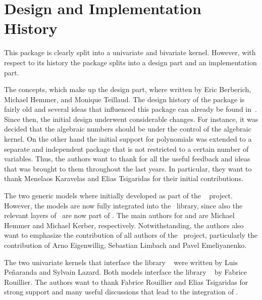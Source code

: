 

\section{Design and Implementation History}

This package is clearly split into a univariate and bivariate
kernel. However, with respect to its history the package splits into
a design part and an implementation part. 

The concepts, which make up the design part, 
where written by Eric Berberich, Michael Hemmer, and
Monique Teillaud. 
The design history of the package is fairly old and several
ideas that influenced this package can already be found
in~\cite{cgal:bhkt-risak-07}. Since then, the initial design underwent
considerable changes. For instance, it was decided that the algebraic
numbers should be under the control of the algebraic kernel. On the other
hand the initial support for polynomials was extended to a separate
and independent package that is not restricted to a certain number of
variables. Thus, the authors want to thank for all the useful feedback and
ideas that was brought to them throughout the last years. In particular,
they want to thank Menelaos Karavelas and Elias Tsigaridas for their
initial contributions.

The two generic models %
where initially developed as part of the \exacus~\cite{beh+-eeeafcs-05} project. 
However, the models are now fully integrated into the \cgal~library, 
since also the relevant layers of \exacus\ are now part of \cgal.
The main authors for  and  are 
Michael Hemmer and Michael Kerber, respectively. Notwithstanding, the authors also want to emphasize the 
contribution of all authors of the \exacus\ project, 
particularly the contribution of Arno Eigenwillig, Sebastian Limbach and Pavel Emeliyanenko. 

The two univariate kernels that interface the library \rs~\cite{cgal:r-rs} were 
written by Luis Pe\~{n}aranda and Sylvain Lazard. 
Both models interface the library \rs~\cite{cgal:r-rs} by Fabrice Rouillier. 
The authors want to thank Fabrice Rouillier and Elias Tsigaridas for 
strong support and many useful discussions that lead to the integration of \rs.


